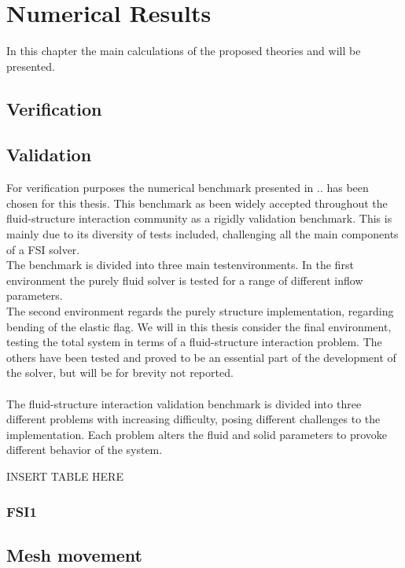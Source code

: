\chapter{Numerical Results}

In this chapter the main calculations of the proposed theories and will be presented. 

\section{Verification}

\section{Validation}
For verification purposes the numerical benchmark presented in .. has been chosen for this thesis. This benchmark as been widely accepted throughout the fluid-structure interaction community as a rigidly validation benchmark. This is mainly due to its diversity of tests included, challenging all the main components of a FSI solver. \\
The benchmark is divided into three main testenvironments.
In the first environment the purely fluid solver is tested for a range of different inflow parameters. \\
The second environment regards the purely structure implementation, regarding bending of the elastic flag. We will in this thesis consider the final environment, testing the total system in terms of a fluid-structure interaction problem. The others have been tested and proved to be an essential part of the development of the solver, but will be for brevity not reported. \\ \\

The fluid-structure interaction validation benchmark is divided into three different problems with increasing difficulty, posing different challenges to the implementation. 
Each problem alters the fluid and solid parameters to provoke different behavior of the system.

INSERT TABLE HERE



\subsection{FSI1}


\section{Mesh movement}